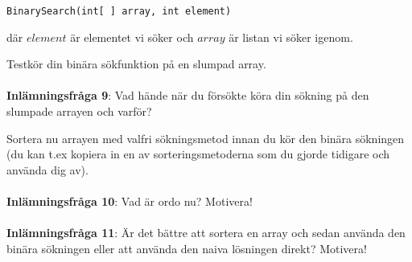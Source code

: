\documentclass{article}
\begin{document}
\begin{lstlisting}
BinarySearch(int[ ] array, int element)
\end{lstlisting}

där $element$ är elementet vi söker och $array$ är listan vi söker igenom.

Testkör din binära sökfunktion på en slumpad array. 
\\\\

\textbf{Inlämningsfråga 9}: Vad hände när du försökte köra din sökning på den slumpade arrayen och varför?
\pagebreak

Sortera nu arrayen med valfri sökningsmetod innan du kör den binära sökningen (du kan t.ex kopiera in en av sorteringsmetoderna som du gjorde tidigare och använda dig av). \\\\
\textbf{Inlämningsfråga 10}: Vad är ordo nu? Motivera! \\\\
\textbf{Inlämningsfråga 11}: Är det bättre att sortera en array och sedan använda den binära sökningen eller att använda den naiva lösningen direkt? Motivera!
\end{document}
